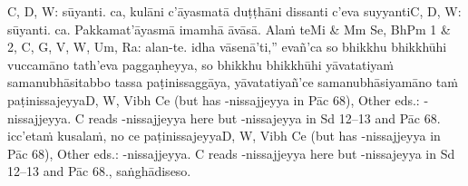 {{{		\hypertarget{endnote-appendix}{\hyperlink{endnote-body}{}}}}}\makeatother C, D, W: sūyanti. ca, kulāni c'āyasmatā duṭṭhāni dissanti c'eva suyyanti\makeatletter\hyperlink{endnote-appendix}\makeatother C, D, W: sūyanti. ca. Pakkamat'āyasmā imamhā āvāsā. Alaṁ te\makeatletter\hyperlink{endnote-appendix}\makeatother Mi & Mm Se, BhPm 1 & 2, C, G, V, W, Um, Ra: alan-te. idha vāsenā'ti,'' evañ'ca so bhikkhu bhikkhūhi vuccamāno tath'eva paggaṇheyya, so bhikkhu bhikkhūhi yāvatatiyaṁ samanubhāsitabbo tassa paṭinissaggāya, yāvatatiyañ'ce samanubhāsiyamāno taṁ paṭinissajeyya\makeatletter\hyperlink{endnote-appendix}\makeatother D, W, Vibh Ce (but has -nissajjeyya in Pāc 68), Other eds.: -nissajjeyya. C reads -nissajjeyya here but -nissajeyya in Sd 12–13
and Pāc 68. icc'etaṁ kusalaṁ, no ce paṭinissajeyya\makeatletter\hyperlink{endnote-appendix}\makeatother D, W, Vibh Ce (but has -nissajjeyya in Pāc 68), Other eds.: -nissajjeyya. C reads -nissajjeyya here but -nissajeyya in Sd 12–13
and Pāc 68., saṅghādiseso.



\medskip

